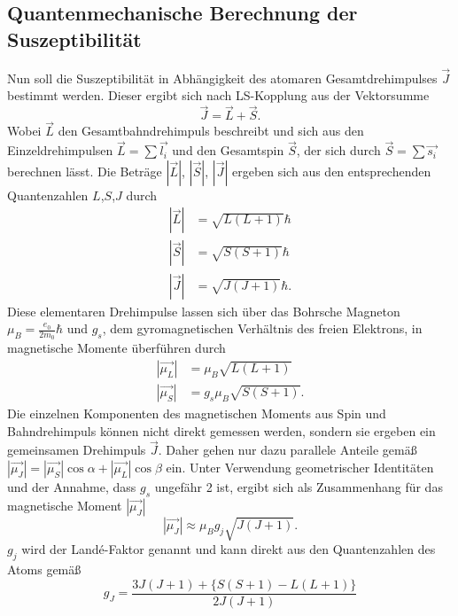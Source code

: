\subsection{Quantenmechanische Berechnung der Suszeptibilität}
Nun soll die Suszeptibilität in Abhängigkeit des atomaren Gesamtdrehimpulses $\vec{J}$ bestimmt werden.
Dieser ergibt sich nach LS-Kopplung aus der Vektorsumme 
\begin{equation}
    \vec{J}= \vec{L}+\vec{S}.
    \label{eq:LS}
\end{equation}
Wobei $\vec{L}$ den Gesamtbahndrehimpuls beschreibt und sich aus den Einzeldrehimpulsen $\vec{L}=\sum\vec{l_i}$
und den Gesamtspin $\vec{S}$, der sich durch $\vec{S}=\sum \vec{s_i}$ berechnen lässt.
Die Beträge $\left|\vec{L}\right|$, $\left|\vec{S}\right|$, $\left|\vec{J}\right|$ ergeben sich aus den
entsprechenden Quantenzahlen $L$,$S$,$J$ durch 
\begin{align}\label{eq:absdreh}
    \left|\vec{L}\right|&=\sqrt{L(L+1)}\hbar\\
    \left|\vec{S}\right|&=\sqrt{S(S+1)}\hbar\\
    \left|\vec{J}\right|&=\sqrt{J(J+1)}\hbar.
\end{align}
Diese elementaren Drehimpulse lassen sich über das Bohrsche Magneton $\mu_B=\frac{e_0}{2m_0}\hbar$ und
$g_s$, dem gyromagnetischen Verhältnis des freien Elektrons, in magnetische Momente überführen durch
\begin{align}\label{eq:absmu}
    \left|\vec{\mu_L}\right|&=\mu_B\sqrt{L(L+1)}\\
    \left|\vec{\mu_S}\right|&=g_s \mu_B\sqrt{S(S+1)}.
\end{align}
Die einzelnen Komponenten des magnetischen Moments aus Spin und Bahndrehimpuls können nicht direkt gemessen werden, sondern
sie ergeben ein gemeinsamen Drehimpuls $\vec{J}$. Daher gehen nur dazu parallele Anteile gemäß
$\left|\vec{\mu_J}\right|=\left|\vec{\mu_S}\right|\cos{\alpha}+\left|\vec{\mu_L}\right|\cos{\beta}$ ein.
Unter Verwendung geometrischer Identitäten und der Annahme, dass $g_s$ ungefähr 2 ist, ergibt sich als Zusammenhang für
das magnetische Moment $\left|\vec{\mu_J}\right|$
\begin{equation}
    \left|\vec{\mu_J}\right| \approx \mu_B g_j \sqrt{J(J+1)}.
    \label{eq:muj}
\end{equation}
$g_j$ wird der Landé-Faktor genannt und kann direkt aus den Quantenzahlen des Atoms gemäß
\begin{equation}
    g_J=\frac{3J(J+1)+\{S(S+1)-L(L+1)\}}{2J(J+1)}
\end{equation}
